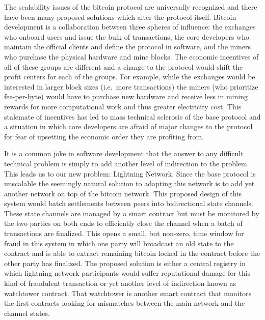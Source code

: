 
The scalability issues of the bitcoin protocol are universally recognized and
there have been many proposed solutions which alter the protocol itself.
\cite{hinzen2019proof} Bitcoin development is a collaboration between three
spheres of influence: the exchanges who onboard users and issue the bulk of
transactions, the core developers who maintain the official clients and define
the protocol in software, and the miners who purchase the physical hardware and
mine blocks. The economic incentives of all of these groups are different and a
change to the protocol would shift the profit centers for each of the groups.
For example, while the exchanges would be interested in larger block sizes
(i.e.~more transactions) the miners (who prioritize fee-per-byte) would have to
purchase new hardware and receive less in mining rewards for more computational
work and thus greater electricity cost. This stalemate of incentives has led to
mass technical sclerosis of the base protocol and a situation in which core
developers are afraid of major changes to the protocol for fear of upsetting the
economic order they are profiting from.


It is a common joke in software development that the answer to any difficult
technical problem is simply to add another level of indirection to the problem.
This leads us to our new problem: Lightning Network. Since the base protocol is
unscalable the seemingly natural solution to adapting this network is to add yet
another network on top of the bitcoin network. This proposed design of this
system would batch settlements between peers into bidirectional state channels.
These state channels are managed by a smart contract but must be monitored by
the two parties on both ends to efficiently close the channel when a batch of
transactions are finalized. This opens a small, but non-zero, time window for
fraud in this system in which one party will broadcast an old state to the
contract and is able to extract remaining bitcoin locked in the contract before
the other party has finalized. The proposed solution is either a central
registry in which lightning network participants would suffer reputational
damage for this kind of fraudulent transaction or yet another level of
indirection known as watchtower contract. That watchtower is another smart
contract that monitors the first contracts looking for mismatches between the
main network and the channel states.

